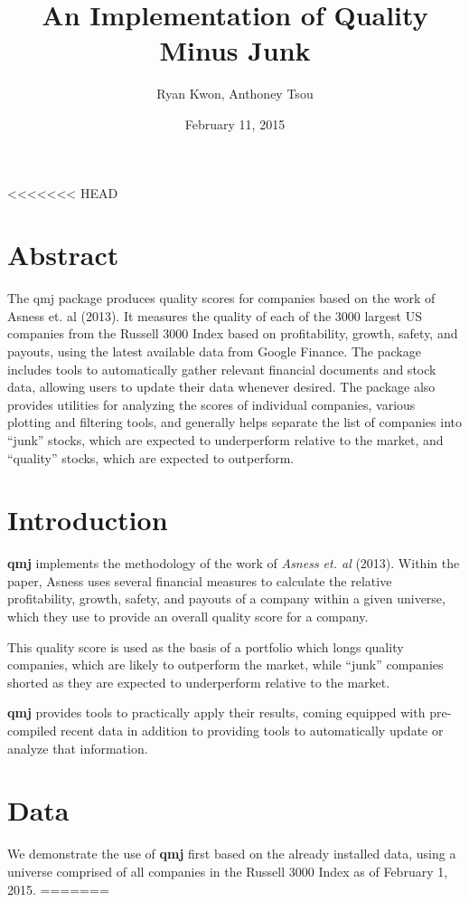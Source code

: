 \documentclass[titlepage]{article}
\author{Ryan Kwon, Anthoney Tsou}
\title{An Implementation of Quality Minus Junk}
\date{February 11, 2015}
\begin{document}

\maketitle
<<<<<<< HEAD

\section*{Abstract}
The qmj package produces quality scores for companies based on the work of Asness et. al (2013). It measures the quality of each of the 3000 largest US companies from the Russell 3000 Index based on profitability, growth, safety, and payouts, using the latest available data from Google Finance. The package includes tools to automatically gather relevant financial documents and stock data, allowing users to update their data whenever desired. The package also provides utilities for analyzing the scores of individual companies, various plotting and filtering tools, and generally helps separate the list of companies into ``junk'' stocks, which are expected to underperform relative to the market, and ``quality'' stocks, which are expected to outperform. 

\section*{Introduction}
\textbf{qmj} implements the methodology of the work of \emph{Asness et. al} (2013). Within the paper, Asness uses several financial measures to calculate the relative profitability, growth, safety, and payouts of a company within a given universe, which they use to provide an overall quality score for a company.

This quality score is used as the basis of a portfolio which longs quality companies, which are likely to outperform the market, while ``junk'' companies shorted as they are expected to underperform relative to the market.

\textbf{qmj} provides tools to practically apply their results, coming equipped with pre-compiled recent data in addition to providing tools to automatically update or analyze that information.

\section*{Data}
We demonstrate the use of \textbf{qmj} first based on the already installed data, using a universe comprised of all companies in the Russell 3000 Index as of February 1, 2015.
=======
\end{document}
